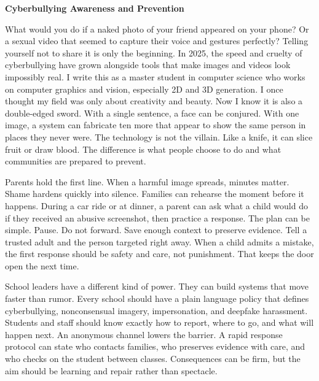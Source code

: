 \documentclass[11pt]{article}
\begin{document}
\vspace*{-18pt}
\begingroup
\centering
\Large\bfseries Cyberbullying Awareness and Prevention \par
\endgroup

What would you do if a naked photo of your friend appeared on your phone? Or a
sexual video that seemed to capture their voice and gestures perfectly? Telling
yourself not to share it is only the beginning. In 2025, the speed and cruelty
of cyberbullying have grown alongside tools that make images and videos look
impossibly real. I write this as a master student in computer science who works
on computer graphics and vision, especially 2D and 3D generation. 
I once thought my field was only about creativity and
beauty. Now I know it is also a double-edged sword. With a single sentence, a face can be
conjured. With one image, a system can fabricate ten more that appear to show
the same person in places they never were. The technology is not the villain.
Like a knife, it can slice fruit or draw blood. 
The difference is what people choose to do and what communities are prepared to prevent.

Parents hold the first line. When a harmful image spreads, minutes matter.
Shame hardens quickly into silence. Families can rehearse the moment before it
happens. During a car ride or at dinner, a parent can ask what a child would do
if they received an abusive screenshot, then practice a response. The plan can
be simple. Pause. Do not forward. Save enough context to preserve evidence. Tell
a trusted adult and the person targeted right away. When a child admits a mistake, the first response should be
safety and care, not punishment. That keeps the door open the next time. 

School leaders have a different kind of power. They can build systems that move
faster than rumor. Every school should have a plain language policy that defines
cyberbullying, nonconsensual imagery, impersonation, and deepfake harassment.
Students and staff should know exactly how to report, where to go, and what will
happen next. An anonymous channel lowers the barrier. A rapid response protocol
can state who contacts families, who preserves evidence with care, and who
checks on the student between classes. Consequences can be firm, but the aim
should be learning and repair rather than spectacle. 
\end{document}
